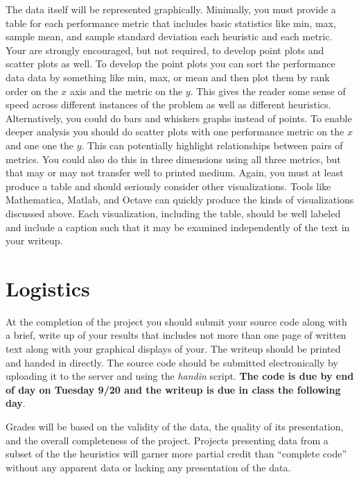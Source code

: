 \documentclass[nobib]{tufte-handout}
\begin{document}
The data itself will be represented graphically. Minimally, you must provide a table for each performance metric that includes basic statistics like min, max, sample mean, and sample standard deviation each heuristic and each metric. Your are strongly encouraged, but not required, to develop point plots and scatter plots as well. To develop the point plots you can sort the performance data data by something like min, max, or mean and then plot them by rank order on the $x$ axis and the metric on the $y$. This gives the reader some sense of speed across different instances of the problem as well as different heuristics. Alternatively, you could do bars and whiskers graphs instead of points. To enable deeper analysis you should do scatter plots with one performance metric on the $x$ and one one the $y$.  This can potentially highlight relationships between pairs of metrics. You could also do this in three dimensions using all three metrics, but that may or may not transfer well to printed medium.  Again, you must at least produce a table and should seriously consider other visualizations.  Tools like Mathematica, Matlab, and Octave can quickly produce the kinds of visualizations discussed above.  Each visualization, including the table, should be well labeled and include a caption such that it may be examined independently of the text in your writeup.


\section{Logistics}

At the completion of the project you should submit your source code along with a brief, write up of your results that includes not more than one page of written text along with your graphical displays of your.  The writeup should be printed and handed in directly. The source code should be submitted electronically by uploading it to the server and using the \textit{handin} script. \textbf{The code is due by end of day on Tuesday 9/20 and the writeup is due in class the following day}.

Grades will be based on the validity of the data, the quality of its presentation, and the overall completeness of the project. Projects presenting data from a subset of the the heuristics will garner more partial credit than ``complete code'' without any apparent data or lacking any presentation of the data.  
\end{document}
